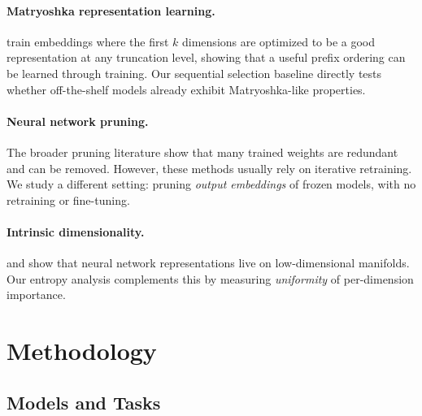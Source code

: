 \documentclass[11pt,a4paper]{article}
\begin{document}
\paragraph{Matryoshka representation learning.}
\citet{matryoshka2023} train embeddings where the first $k$ dimensions are optimized to be a good representation at any truncation level, showing that a useful prefix ordering can be learned through training. Our sequential selection baseline directly tests whether off-the-shelf models already exhibit Matryoshka-like properties.

\paragraph{Neural network pruning.}
The broader pruning literature \citep{han2015pruning,lottery-ticket,structured-pruning} show that many trained weights are redundant and can be removed. However, these methods usually rely on iterative retraining. We study a different setting: pruning \emph{output embeddings} of frozen models, with no retraining or fine-tuning.

\paragraph{Intrinsic dimensionality.}
\citet{li2018measuring} and \citet{alemohammad2023intrinsic} show that neural network representations live on low-dimensional manifolds. Our entropy analysis complements this by measuring \emph{uniformity} of per-dimension importance.

\section{Methodology}
\label{sec:method}
\subsection{Models and Tasks}
\end{document}

